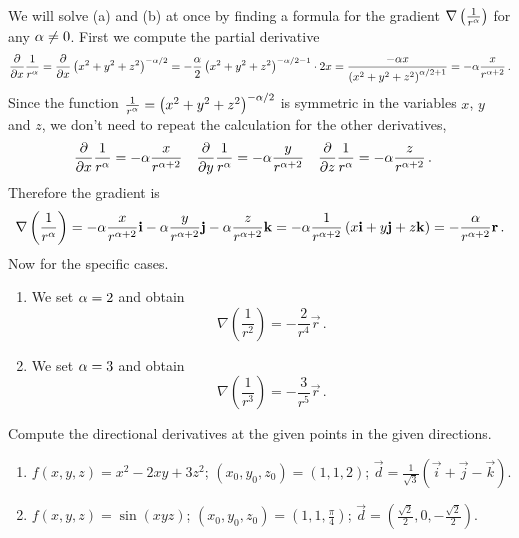 \begin{solution}
We will solve (a) and (b) at once by finding a formula for the gradient $\nabla \left( \frac{1}{r^\alpha}\right)$ for any $\alpha \neq 0$. First we compute the partial derivative
\[
\frac{\partial}{\partial x} \frac{1}{r^\alpha} = \frac{\partial}{\partial x} \left(x^2 + y^2 + z^2\right)^{-\alpha/2}
= -\frac{\alpha}2 \left(x^2 + y^2 + z^2 \right)^{-\alpha/2 - 1} \cdot 2x
= \frac{-\alpha x}{\left(x^2 + y^2 + z^2 \right)^{\alpha/2+1}} = -\alpha \frac{x}{r^{\alpha+2}}\,.
\]
Since the function $ \frac{1}{r^\alpha} = \left(x^2 + y^2 + z^2\right)^{-\alpha/2}$ is symmetric in the variables $x$, $y$ and $z$, we don't need to repeat the calculation for the other derivatives,
\begin{align*}
\frac{\partial}{\partial x} \frac{1}{r^\alpha} &= -\alpha \frac{x}{r^{\alpha+2}} &
\frac{\partial}{\partial y} \frac{1}{r^\alpha} &= -\alpha \frac{y}{r^{\alpha+2}} &
\frac{\partial}{\partial z} \frac{1}{r^\alpha} &= -\alpha \frac{z}{r^{\alpha+2}}\,.
\end{align*}
Therefore the gradient is
\[
\nabla \left(\frac{1}{r^\alpha}\right)
= -\alpha \frac{x}{r^{\alpha+2}} \bm{\mathrm{i}} -\alpha \frac{y}{r^{\alpha+2}} \bm{\mathrm{j}} 
-\alpha \frac{z}{r^{\alpha+2}} \bm{\mathrm{k}}
= -\alpha \frac{1}{r^{\alpha+2}} \left(x \bm{\mathrm{i}} + y \bm{\mathrm{j}} + z \bm{\mathrm{k}} \right)
= -\frac{\alpha}{r^{\alpha+2}} \bm{\mathrm{r}}\,.
\]
Now for the specific cases.
\begin{enumerate}
\item
We set $\alpha =2$ and obtain
\[
\nabla \left( \frac{1}{r^2}\right)
= - \frac{2}{r^{4}} \vec r\,.
\]
\item
We set $\alpha =3$ and obtain
\[
\nabla \left( \frac{1}{r^3}\right)
= - \frac{3}{r^{5}} \vec r\,.
\]
\end{enumerate}
\end{solution}

\begin{question}
Compute the directional derivatives at the given points in the given directions.
\begin{enumerate}
\item
$f(x,y,z) = x^2 - 2xy + 3z^2$;
$(x_0,y_0,z_0) = (1,1,2)$;
$\vec d = \frac 1{\sqrt{3}} 
\left(\vec i + \vec j - \vec k \right)$.
\item
$f(x,y,z) = \sin\left(xyz\right)$;
$(x_0,y_0,z_0) = \left(1, 1, \frac \pi 4 \right)$;
$\vec d = \left(\frac{\sqrt 2}2, 0, -\frac{\sqrt 2}2\right)$.
\end{enumerate}
\end{question}

